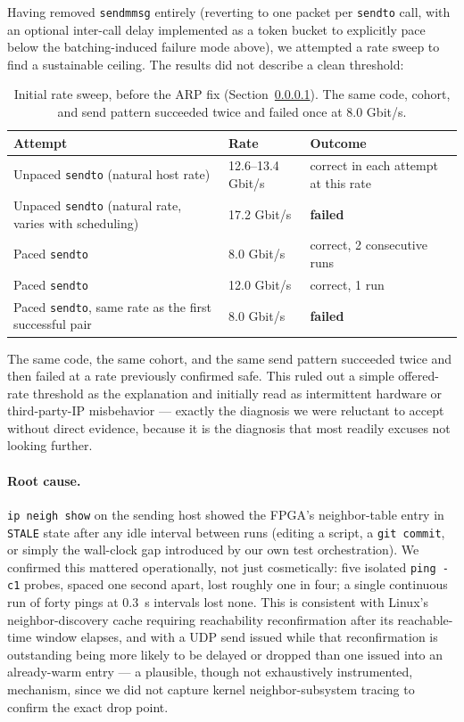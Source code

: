 \documentclass[11pt,a4paper]{article}
\newcommand{\code}[1]{\texttt{#1}}
\begin{document}
Having removed \code{sendmmsg} entirely (reverting to one packet per
\code{sendto} call, with an optional inter-call delay implemented as a
token bucket to explicitly pace below the batching-induced failure mode
above), we attempted a rate sweep to find a sustainable ceiling. The
results did not describe a clean threshold:

\begin{table}[h]
\centering
\small
\begin{tabular}{@{}p{}p{}p{}@{}}
\toprule
Attempt & Rate & Outcome \\
\midrule
Unpaced \code{sendto} (natural host rate) & 12.6--13.4 Gbit/s & correct in each attempt at this rate \\
Unpaced \code{sendto} (natural rate, varies with scheduling) & 17.2 Gbit/s & \textbf{failed} \\
Paced \code{sendto} & 8.0 Gbit/s & correct, 2 consecutive runs \\
Paced \code{sendto} & 12.0 Gbit/s & correct, 1 run \\
Paced \code{sendto}, same rate as the first successful pair & 8.0 Gbit/s & \textbf{failed} \\
\bottomrule
\end{tabular}
\caption{Initial rate sweep, before the ARP fix (Section~\ref{sec:arp}). The same
code, cohort, and send pattern succeeded twice and failed once at 8.0 Gbit/s.}
\end{table}

The same code, the same cohort, and the same send pattern succeeded
twice and then failed at a rate previously confirmed safe. This ruled
out a simple offered-rate threshold as the explanation and initially
read as intermittent hardware or third-party-IP misbehavior --- exactly
the diagnosis we were reluctant to accept without direct evidence,
because it is the diagnosis that most readily excuses not looking
further.

\paragraph{Root cause.}
\label{sec:arp}
\code{ip neigh show} on the sending host showed the FPGA's
neighbor-table entry in \code{STALE} state after any idle interval
between runs (editing a script, a \code{git commit}, or simply the
wall-clock gap introduced by our own test orchestration). We confirmed
this mattered operationally, not just cosmetically: five isolated
\code{ping -c1} probes, spaced one second apart, lost roughly one in
four; a single continuous run of forty pings at 0.3~s intervals lost
none. This is consistent with Linux's neighbor-discovery cache requiring
reachability reconfirmation after its reachable-time window elapses, and
with a UDP send issued while that reconfirmation is outstanding being
more likely to be delayed or dropped than one issued into an
already-warm entry --- a plausible, though not exhaustively instrumented,
mechanism, since we did not capture kernel neighbor-subsystem tracing to
confirm the exact drop point.
\end{document}
